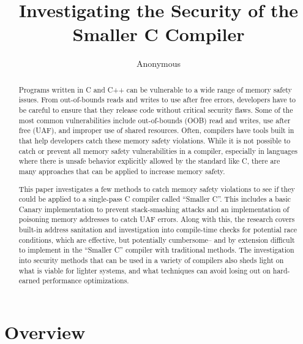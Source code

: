 \documentclass[sigconf, anonymous]{acmart}
\begin{document}
\title{Investigating the Security of the Smaller C Compiler}

\author{Anonymous}

\begin{abstract}

Programs written in C and C++ can be vulnerable to a wide range of memory safety issues. From out-of-bounds reads and writes to use after free errors, developers have to be careful to ensure that they release code without critical security flaws. Some of the most common vulnerabilities include out-of-bounds (OOB) read and writes, use after free (UAF), and improper use of shared resources. Often, compilers have tools built in that help developers catch these memory safety violations. While it is not possible to catch or prevent all memory safety vulnerabilities in a compiler, especially in languages where there is unsafe behavior explicitly allowed by the standard like C, there are many approaches that can be applied to increase memory safety.
  
This paper investigates a few methods to catch memory safety violations to see if they could be applied to a single-pass C compiler called “Smaller C”. This includes a basic Canary implementation to prevent stack-smashing attacks and an implementation of poisoning memory addresses to catch UAF errors. Along with this, the research covers built-in address sanitation and investigation into compile-time checks for potential race conditions, which are effective, but potentially cumbersome– and by extension difficult to implement in the “Smaller C” compiler with traditional methods. The investigation into security methods that can be used in a variety of compilers also sheds light on what is viable for lighter systems, and what techniques can avoid losing out on hard-earned performance optimizations.

\end{abstract}


\maketitle


\section{Overview}
\label{motivation}
\end{document}
